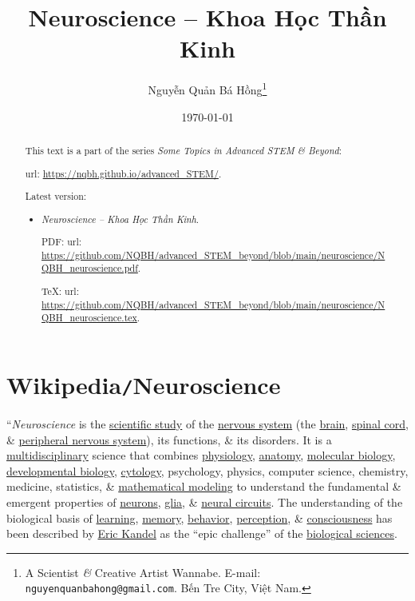 \documentclass{article}
\title{Neuroscience -- Khoa Học Thần Kinh}
\author{Nguyễn Quản Bá Hồng\footnote{A Scientist {\it\&} Creative Artist Wannabe. E-mail: {\tt nguyenquanbahong@gmail.com}. Bến Tre City, Việt Nam.}}
\date{\today}
\begin{document}
\maketitle
\begin{abstract}
	This text is a part of the series {\it Some Topics in Advanced STEM \& Beyond}:
	
	{\sc url}: \url{https://nqbh.github.io/advanced_STEM/}.
	
	Latest version:
	\begin{itemize}
		\item {\it Neuroscience -- Khoa Học Thần Kinh}.
		
		PDF: {\sc url}: \url{https://github.com/NQBH/advanced_STEM_beyond/blob/main/neuroscience/NQBH_neuroscience.pdf}.
		
		\TeX: {\sc url}: \url{https://github.com/NQBH/advanced_STEM_beyond/blob/main/neuroscience/NQBH_neuroscience.tex}.
	\end{itemize}
\end{abstract}
\tableofcontents


\section{Wikipedia{\tt/}Neuroscience}
``{\it Neuroscience} is the \href{https://en.wikipedia.org/wiki/Science}{scientific study} of the \href{https://en.wikipedia.org/wiki/Nervous_system}{nervous system} (the \href{https://en.wikipedia.org/wiki/Brain}{brain}, \href{https://en.wikipedia.org/wiki/Spinal_cord}{spinal cord}, \& \href{https://en.wikipedia.org/wiki/Peripheral_nervous_system}{peripheral nervous system}), its functions, \& its disorders. It is a \href{https://en.wikipedia.org/wiki/Multidisciplinary_approach}{multidisciplinary} science that combines \href{https://en.wikipedia.org/wiki/Physiology}{physiology}, \href{https://en.wikipedia.org/wiki/Anatomy}{anatomy}, \href{https://en.wikipedia.org/wiki/Molecular_biology}{molecular biology}, \href{https://en.wikipedia.org/wiki/Developmental_biology}{developmental biology}, \href{https://en.wikipedia.org/wiki/Cytology}{cytology}, psychology, physics, computer science, chemistry, medicine, statistics, \& \href{https://en.wikipedia.org/wiki/Mathematical_Modeling}{mathematical modeling} to understand the fundamental \& emergent properties of \href{https://en.wikipedia.org/wiki/Neuron}{neurons}, \href{https://en.wikipedia.org/wiki/Glia}{glia}, \& \href{https://en.wikipedia.org/wiki/Neural_circuit}{neural circuits}. The understanding of the biological basis of \href{https://en.wikipedia.org/wiki/Learning}{learning}, \href{https://en.wikipedia.org/wiki/Memory}{memory}, \href{https://en.wikipedia.org/wiki/Behavior}{behavior}, \href{https://en.wikipedia.org/wiki/Perception}{perception}, \& \href{https://en.wikipedia.org/wiki/Consciousness}{consciousness} has been described by \href{https://en.wikipedia.org/wiki/Eric_Kandel}{Eric Kandel} as the ``epic challenge'' of the \href{https://en.wikipedia.org/wiki/Biology}{biological sciences}.
\end{document}

